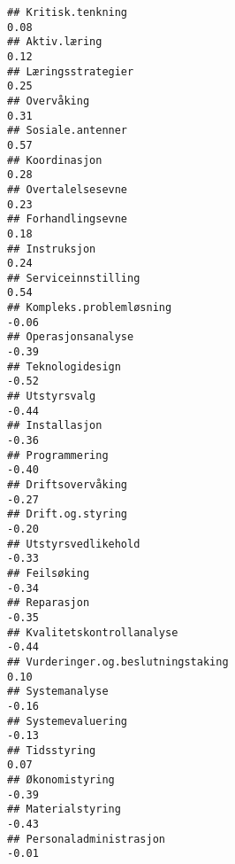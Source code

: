 \documentclass[
]{article}
\begin{document}
\begin{verbatim}
## Kritisk.tenkning                                                                  0.08
## Aktiv.læring                                                                      0.12
## Læringsstrategier                                                                 0.25
## Overvåking                                                                        0.31
## Sosiale.antenner                                                                  0.57
## Koordinasjon                                                                      0.28
## Overtalelsesevne                                                                  0.23
## Forhandlingsevne                                                                  0.18
## Instruksjon                                                                       0.24
## Serviceinnstilling                                                                0.54
## Kompleks.problemløsning                                                          -0.06
## Operasjonsanalyse                                                                -0.39
## Teknologidesign                                                                  -0.52
## Utstyrsvalg                                                                      -0.44
## Installasjon                                                                     -0.36
## Programmering                                                                    -0.40
## Driftsovervåking                                                                 -0.27
## Drift.og.styring                                                                 -0.20
## Utstyrsvedlikehold                                                               -0.33
## Feilsøking                                                                       -0.34
## Reparasjon                                                                       -0.35
## Kvalitetskontrollanalyse                                                         -0.44
## Vurderinger.og.beslutningstaking                                                  0.10
## Systemanalyse                                                                    -0.16
## Systemevaluering                                                                 -0.13
## Tidsstyring                                                                       0.07
## Økonomistyring                                                                   -0.39
## Materialstyring                                                                  -0.43
## Personaladministrasjon                                                           -0.01

\end{verbatim}
\end{document}

